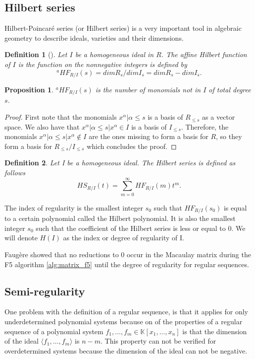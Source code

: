 \documentclass[english]{article}
\newtheorem{proposition}{Proposition}[section]
\newtheorem{definition}{Definition}[section]
\begin{document}
		\subsection{Hilbert series}
		Hilbert-Poincaré series (or Hilbert series) is a very important tool in algebraic geometry to describe ideals, varieties and their dimensions.
		\begin{definition}[\cite{CLS}]
			Let $I$ be a homogeneous ideal in $R$. The affine Hilbert function of $I$ is the function on the nonnegative integers is defined by
			$$
				{}^a HF_{R/I}(s) = dim R_{s} / dim I_{s} = dim R_{s} - dim I_{s}.
			$$
		\end{definition}
		
		\begin{proposition}
			${}^a HF_{R/I}(s)$ is the number of monomials not in $I$ of total degree $s$.
		\end{proposition}
		\begin{proof}
			First note that the monomials ${x^\alpha | \alpha \leq s}$ is a basis of $R_{\leq s}$ as a vector space. We also have that ${x^\alpha | \alpha \leq s | x^\alpha \in I}$ is a basis of $I_{\leq s}$. Therefore, the monomials ${x^\alpha | \alpha \leq s | x^\alpha \notin I}$ are the ones missing to form a basis for $R$, so they form a basis for $R_{\leq s} / I_{\leq s}$ which concludes the proof.
		\end{proof}
		
		\begin{definition}
			Let I be a homogeneous ideal. The Hilbert series is defined as follows
			$$
					HS_{R/I}(t) = \sum_{m=0}^{\infty} HF_{R/I}(m) t^m.
			$$	
		\end{definition}
		
		The index of regularity is the smallest integer $s_0$ such that $HF_{R/I}(s_0)$ is equal to a certain polynomial called the Hilbert polynomial. It is also the smallest integer $s_0$ such that the coefficient of the Hilbert series is less or equal to 0. We will denote $H(I)$ as the index or degree of regularity of I.
		
		Faugère showed that no reductions to 0 occur in the Macaulay matrix during the F5 algorithm \ref{alg:matrix_f5} until the degree of regularity \cite{F02} for regular sequences.
		
		\subsection{Semi-regularity}
		One problem with the definition of a regular sequence, is that it applies for only underdetermined  polynomial systems because on of the properties of a regular sequence of a polynomial system $f_1,\dots,f_m \in \mathbb{K}[x_1,\dots,x_n]$ is that the dimension of the ideal $\langle f_1,\dots,f_m \rangle$ is $n - m$. This property can not be verified for overdetermined systems because the dimension of the ideal can not be negative.
		
\end{document}
